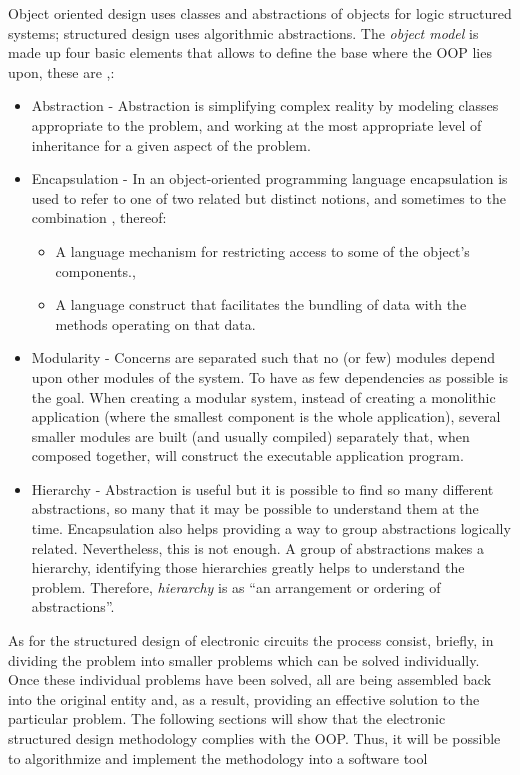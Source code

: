 \documentclass[twocolumn]{IEEEtran}
\begin{document}
Object oriented design uses classes and abstractions of objects for logic structured systems; structured design uses algorithmic abstractions. The {\it object model} is made up four basic elements that allows to define the base where the OOP lies upon, these are \cite{joyanes},\cite{booch}:

\begin{itemize}
\item Abstraction - Abstraction is simplifying complex reality by modeling classes appropriate to the problem, and working at the most appropriate level of inheritance for a given aspect of the problem.
\item Encapsulation - In an object-oriented programming language encapsulation is used to refer to one of two related but distinct notions, and sometimes to the combination \cite{scott},\cite{dale} thereof:
	\begin{itemize}
    \item A language mechanism for restricting access to some of the object's components.\cite{mitchell},\cite{pierce}
    \item A language construct that facilitates the bundling of data with the methods operating on that data.\cite{connolly}
    \end{itemize}
\item Modularity - Concerns are separated such that no (or few) modules depend upon other modules of the system. To have as few dependencies as possible is the goal. When creating a modular system, instead of creating a monolithic application (where the smallest component is the whole application), several smaller modules are built (and usually compiled) separately that, when composed together, will construct the executable application program.
\item Hierarchy - Abstraction is useful but it is possible to find so many different abstractions, so many that it may be possible to understand them at the time. Encapsulation also helps providing a way to group abstractions logically related. Nevertheless, this is not enough. A group of abstractions makes a hierarchy, identifying those hierarchies greatly helps to understand the problem. Therefore, {\it hierarchy} is as ``an arrangement or ordering of abstractions''.
\end{itemize}

As for the structured design of electronic circuits the process consist, briefly, in dividing the problem into smaller problems which can be solved individually. Once these individual problems have been solved, all are being assembled back into the original entity and, as a result, providing an effective solution to the particular problem. The following sections will show that the electronic structured design methodology complies with the OOP. Thus, it will be possible to algorithmize and implement the methodology into a software tool
\end{document}
